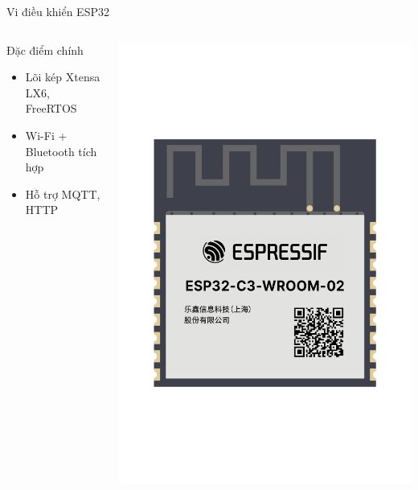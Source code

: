 \begin{frame}{Vi điều khiển ESP32}
\begin{columns}
\begin{block}{Đặc điểm chính}
\begin{itemize}
\item Lõi kép Xtensa LX6, FreeRTOS
\item Wi-Fi + Bluetooth tích hợp
\item Hỗ trợ MQTT, HTTP
\end{itemize}
\end{block}

\begin{center}
    \includegraphics[width=\linewidth]{images/esp32_c3.png}
\end{center}
\end{columns}
\end{frame}

